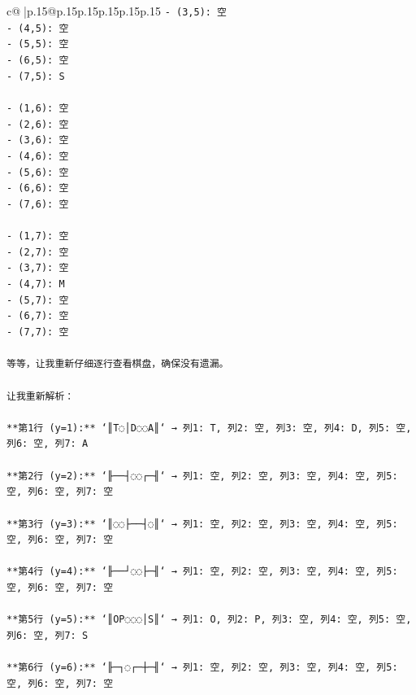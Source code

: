 \documentclass{article}
\begin{document}
{\begin{supertabular}{c@{$\;$}|p{.15\linewidth}@{}p{.15\linewidth}p{.15\linewidth}p{.15\linewidth}p{.15\linewidth}p{.15\linewidth}}
{{{\texttt{{-} (3,5): 空} \\
\texttt{{-} (4,5): 空} \\
\texttt{{-} (5,5): 空} \\
\texttt{{-} (6,5): 空} \\
\texttt{{-} (7,5): S} \\
\\ 
\texttt{{-} (1,6): 空} \\
\texttt{{-} (2,6): 空} \\
\texttt{{-} (3,6): 空} \\
\texttt{{-} (4,6): 空} \\
\texttt{{-} (5,6): 空} \\
\texttt{{-} (6,6): 空} \\
\texttt{{-} (7,6): 空} \\
\\ 
\texttt{{-} (1,7): 空} \\
\texttt{{-} (2,7): 空} \\
\texttt{{-} (3,7): 空} \\
\texttt{{-} (4,7): M} \\
\texttt{{-} (5,7): 空} \\
\texttt{{-} (6,7): 空} \\
\texttt{{-} (7,7): 空} \\
\\ 
\texttt{等等，让我重新仔细逐行查看棋盘，确保没有遗漏。} \\
\\ 
\texttt{让我重新解析：} \\
\\ 
\texttt{**第1行 (y=1):** `║T◌│D◌◌A║` → 列1: T, 列2: 空, 列3: 空, 列4: D, 列5: 空, 列6: 空, 列7: A} \\
\\ 
\texttt{**第2行 (y=2):** `╟──┤◌◌┌─╢` → 列1: 空, 列2: 空, 列3: 空, 列4: 空, 列5: 空, 列6: 空, 列7: 空} \\
\\ 
\texttt{**第3行 (y=3):** `║◌◌├──┤◌║` → 列1: 空, 列2: 空, 列3: 空, 列4: 空, 列5: 空, 列6: 空, 列7: 空} \\
\\ 
\texttt{**第4行 (y=4):** `╟──┘◌◌├─╢` → 列1: 空, 列2: 空, 列3: 空, 列4: 空, 列5: 空, 列6: 空, 列7: 空} \\
\\ 
\texttt{**第5行 (y=5):** `║OP◌◌◌│S║` → 列1: O, 列2: P, 列3: 空, 列4: 空, 列5: 空, 列6: 空, 列7: S} \\
\\ 
\texttt{**第6行 (y=6):** `╟─┐◌┌─┼─╢` → 列1: 空, 列2: 空, 列3: 空, 列4: 空, 列5: 空, 列6: 空, 列7: 空} \\
}}}
\end{supertabular}}
\end{document}
